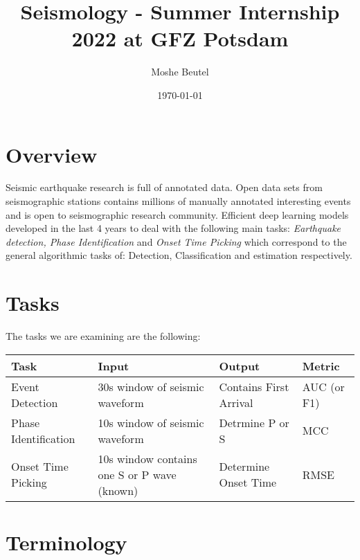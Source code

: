 \documentclass[11pt,a4paper]{article}
\title{Seismology - Summer Internship 2022 at GFZ Potsdam}
\author{Moshe Beutel}
\date{\today}
\begin{document}
\maketitle

\section{Overview}
Seismic earthquake research is full of annotated data. Open data sets from seismographic stations contains millions of manually annotated interesting events and is open to seismographic research community.
Efficient deep learning models developed in the last 4 years to deal with the following main tasks:\textit{ Earthquake detection, Phase Identification} and \textit{  Onset Time Picking} which correspond to the general algorithmic tasks of: Detection, Classification and estimation respectively.

\section{Tasks}
The tasks we are examining are the following:

\begin{center}

\begin{tabular}{ | m{4cm} | m{3cm}| m{3cm} |m{2cm} |} 
 \hline
 Task & Input & Output & Metric \\ 
 \hline\hline
 Event Detection & 30s window of seismic waveform & Contains First Arrival & AUC (or F1) \\ 
 \hline
 Phase Identification & 10s window of seismic waveform & Detrmine P or S & MCC \\
 \hline
 Onset Time Picking & 10s window contains one S or P wave (known) & Determine Onset Time & RMSE \\
 \hline
\end{tabular}
\end{center}

\section{Terminology}
\end{document}
